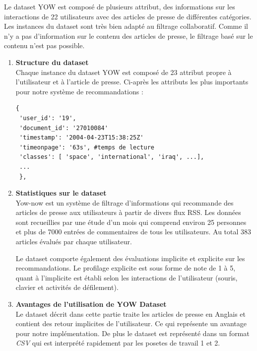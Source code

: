     Le dataset YOW est composé de plusieurs attribut, des informations sur les interactions de 22 utilisateurs avec des articles de presse de différentes catégories. Les instances du dataset sont très bien adapté au filtrage collaboratif. Comme il n'y a pas d'information sur le contenu des articles de presse, le filtrage basé sur le contenu n'est pas possible. \\
    \begin{enumerate}[leftmargin=*]
        \item\textbf{Structure du dataset}\\
        Chaque instance du dataset YOW est composé de 23 attribut propre à l'utilisateur et à l'article de presse. Ci-après les attributs les plus importants pour notre système de recommandations :  \\
\begin{lstlisting}[style=code] 
 {
 'user_id': '19', 
 'document_id': '27010084'
 'timestamp': '2004-04-23T15:38:25Z'
 'timeonpage': '63s', #temps de lecture
 'classes': [ 'space', 'international', 'iraq', ...],
 ...
 },
\end{lstlisting}
    \item\textbf{Statistiques sur le dataset}\\
    Yow-now est un système de filtrage d'informations qui recommande des articles de presse aux utilisateurs à partir de divers flux RSS. Les données sont recueillies par une étude d'un mois qui comprend environ 25 personnes et plus de 7000 entrées de commentaires de tous les utilisateurs. Au total 383 articles évalués par chaque utilisateur. 

    Le dataset comporte également des évaluations implicite et explicite sur les recommandations. Le profilage explicite est sous forme de note de 1 à 5, quant à l'implicite est établi selon les interactions de l'utilisateur (souris, clavier et activités de défilement).\\

    \item\textbf{Avantages de l'utilisation de \textquotedbl YOW Dataset\textquotedbl}\\
     Le dataset décrit dans cette partie traite les articles de presse en Anglais et contient des retour implicites de l'utilisateur. Ce qui représente un avantage pour notre implémentation. De plus le dataset est représenté dans un format \emph{CSV} qui est interprété rapidement par les posetes de travail 1 et 2.\\
\end{enumerate}

